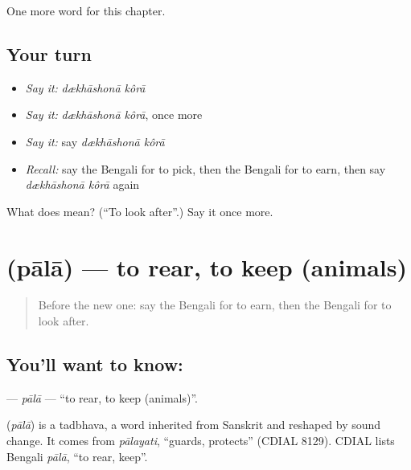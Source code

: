 \begin{grammarlens}[title={What you've built}]
One more word for this chapter.
\end{grammarlens}

\subsection*{Your turn}
\begin{itemize}
\raggedright
  \item \emph{Say it:} \emph{dækhāshonā kôrā}
  \item \emph{Say it:} \emph{dækhāshonā kôrā}, once more
  \item \emph{Say it:} say \emph{dækhāshonā kôrā}
  \item \emph{Recall:} say the Bengali for to pick, then the Bengali for to earn, then say \emph{dækhāshonā kôrā} again
\end{itemize}

\begin{tcolorbox}[breakable,colback=teal!4,colframe=teal!35!black,title={Before you move on}]
What does   mean? (\textquotedblleft{}To look after\textquotedblright{}.) Say it once more.
\end{tcolorbox}
\section[\texorpdfstring{\bn{পালা} (pālā)}{পালা (pālā)}]{ (pālā) — to rear, to keep (animals)}

\label{lesson:BN-C180-pala}



\begin{quote}
Before the new one: say the Bengali for to earn, then the Bengali for to look after.
\end{quote}

\subsection*{You'll want to know: }
\textbf{} — \emph{pālā} — \textquotedblleft{}to rear, to keep (animals)\textquotedblright{}.

\begin{cousinweb}
\textbf{} (\emph{pālā}) is a tadbhava, a word inherited from Sanskrit and reshaped by sound change. It comes from \emph{pālayati}, \textquotedblleft{}guards, protects\textquotedblright{} (CDIAL 8129). CDIAL lists Bengali \emph{pālā}, \textquotedblleft{}to rear, keep\textquotedblright{}.
\end{cousinweb}

